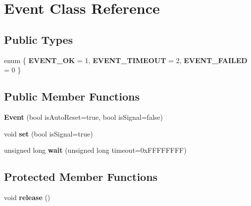 \hypertarget{class_event}{}\section{Event Class Reference}
\label{class_event}
\subsection*{Public Types}
\begin{DoxyCompactItemize}
\item 
enum \{ {\bfseries E\+V\+E\+N\+T\+\_\+\+OK} = 1, 
{\bfseries E\+V\+E\+N\+T\+\_\+\+T\+I\+M\+E\+O\+UT} = 2, 
{\bfseries E\+V\+E\+N\+T\+\_\+\+F\+A\+I\+L\+ED} = 0
 \}\hypertarget{class_event_a99a155041141cae7621f251dfdbea0aa}{}\label{class_event_a99a155041141cae7621f251dfdbea0aa}

\end{DoxyCompactItemize}
\subsection*{Public Member Functions}
\begin{DoxyCompactItemize}
\item 
{\bfseries Event} (bool is\+Auto\+Reset=true, bool is\+Signal=false)\hypertarget{class_event_a1a533c1311f6e5e216e18cdb0a195562}{}\label{class_event_a1a533c1311f6e5e216e18cdb0a195562}

\item 
void {\bfseries set} (bool is\+Signal=true)\hypertarget{class_event_a8fe592771e891bbaa524e6681b870db2}{}\label{class_event_a8fe592771e891bbaa524e6681b870db2}

\item 
unsigned long {\bfseries wait} (unsigned long timeout=0x\+F\+F\+F\+F\+F\+F\+F\+F)\hypertarget{class_event_a026f379d5eba34adbfd1892a2c5a1f43}{}\label{class_event_a026f379d5eba34adbfd1892a2c5a1f43}

\end{DoxyCompactItemize}
\subsection*{Protected Member Functions}
\begin{DoxyCompactItemize}
\item 
void {\bfseries release} ()\hypertarget{class_event_aa6b17dba2949879c7e19e3651d061b7b}{}\label{class_event_aa6b17dba2949879c7e19e3651d061b7b}

\end{DoxyCompactItemize}
